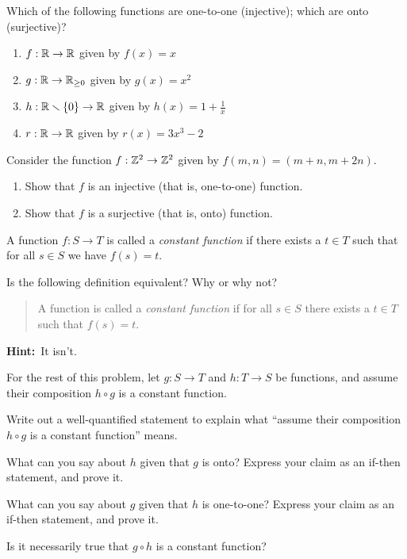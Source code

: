 \documentclass[12pt,letterpaper]{article}
\begin{document}
\thispagestyle{fancy}

\begin{enumerate}
  \Problem
  Which of the following functions are one-to-one (injective); which are onto (surjective)?

  \begin{enumerate}
  \item $f:\mathbb{R}\to\mathbb{R}$ given by $f(x) = x$\vfill
  \item $g:\mathbb{R}\to\mathbb{R}_{\ge0}$ given by $g(x) = x^2$\vfill
  \item $h:\mathbb{R}\smallsetminus\{0\}\to\mathbb{R}$ given by $h(x) = 1+\frac{1}{x}$\vfill
  \item $r:\mathbb{R}\to\mathbb{R}$ given by $r(x) = 3x^3-2$\vfill
  \end{enumerate}

  \Problem Consider the function $f:\mathbb{Z}^2 \to\mathbb{Z}^2$ given by $f(m,n) = (m+n,m+2n)$.
  \begin{enumerate}
  \item Show that $f$ is an injective (that is, one-to-one) function. \vfill\vfill\vfill
  \item Show that $f$ is a surjective (that is, onto) function. \vfill\vfill\vfill
  \end{enumerate}

  \newpage

  \Problem A function $f:S\to T$ is called a \emph{constant function}
  if there exists a $t\in T$ such that for all $s\in S$ we have $f(s) = t$.
  \begin{enumerate} 
    \Part Is the following definition equivalent? Why or why not?
    \begin{quote}
      A function is called a \emph{constant function} if for all $s\in
      S$ there exists a $t\in T$ such that $f(s)=t$.
    \end{quote}
    \textbf{Hint:}\ It isn't.
    \vspace{.7in}
  \end{enumerate}

  For the rest of this problem, let $g:S\to T$ and $h:T\to S$ be
  functions, and assume their composition $h\circ g$ is a constant
  function.
  \begin{enumerate}
    \Part Write out a well-quantified statement to explain what
    ``assume their composition $h\circ g$ is a constant function''
    means.  
    \vspace{.7in}

    \Part  What can you say about $h$ given that $g$ is onto?  Express
    your claim as an if-then statement, and prove it. 
    \vfill
    \vfill

    \Part What can you say about $g$ given that $h$ is one-to-one?
    Express your claim as an if-then statement, and prove it. 
    \vfill
    \vfill
    
    \Part Is it necessarily true that $g\circ h$ is a constant
    function? 
    \vfill
  \end{enumerate}
  

\end{enumerate}
\end{document}
